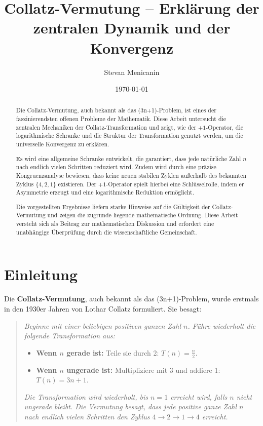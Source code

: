 \documentclass[a4paper,12pt]{article}
\title{Collatz-Vermutung – Erklärung der zentralen Dynamik und der Konvergenz}
\author{Stevan Menicanin}
\date{\today}
\begin{document}
\maketitle

\begin{abstract}
    Die Collatz-Vermutung, auch bekannt als das (3n+1)-Problem, ist eines der faszinierendsten offenen Probleme der Mathematik. Diese Arbeit untersucht die zentralen Mechaniken der Collatz-Transformation und zeigt, wie der \(+1\)-Operator, die logarithmische Schranke und die Struktur der Transformation genutzt werden, um die universelle Konvergenz zu erklären.

    Es wird eine allgemeine Schranke entwickelt, die garantiert, dass jede natürliche Zahl \( n \) nach endlich vielen Schritten reduziert wird. Zudem wird durch eine präzise Kongruenzanalyse bewiesen, dass keine neuen stabilen Zyklen außerhalb des bekannten Zyklus \( \{4, 2, 1\} \) existieren. Der \(+1\)-Operator spielt hierbei eine Schlüsselrolle, indem er Asymmetrie erzeugt und eine logarithmische Reduktion ermöglicht.

    Die vorgestellten Ergebnisse liefern starke Hinweise auf die Gültigkeit der Collatz-Vermutung und zeigen die zugrunde liegende mathematische Ordnung. Diese Arbeit versteht sich als Beitrag zur mathematischen Diskussion und erfordert eine unabhängige Überprüfung durch die wissenschaftliche Gemeinschaft.
\end{abstract}





\newpage
\tableofcontents

\newpage

\section{Einleitung}
Die \textbf{Collatz-Vermutung}, auch bekannt als das (3n+1)-Problem, wurde erstmals in den 1930er Jahren von Lothar Collatz formuliert. Sie besagt:

\begin{quote}
\textit{Beginne mit einer beliebigen positiven ganzen Zahl \( n \). Führe wiederholt die folgende Transformation aus:}
\begin{itemize}
    \item \textbf{Wenn \( n \) gerade ist:} Teile sie durch 2: \( T(n) = \frac{n}{2} \).
    \item \textbf{Wenn \( n \) ungerade ist:} Multipliziere mit 3 und addiere 1: \( T(n) = 3n + 1 \).
\end{itemize}
\textit{Die Transformation wird wiederholt, bis \( n = 1 \) erreicht wird, falls \( n \) nicht ungerade bleibt. Die Vermutung besagt, dass jede positive ganze Zahl \( n \) nach endlich vielen Schritten den Zyklus \( 4 \to 2 \to 1 \to 4 \) erreicht.}
\end{quote}
\end{document}
